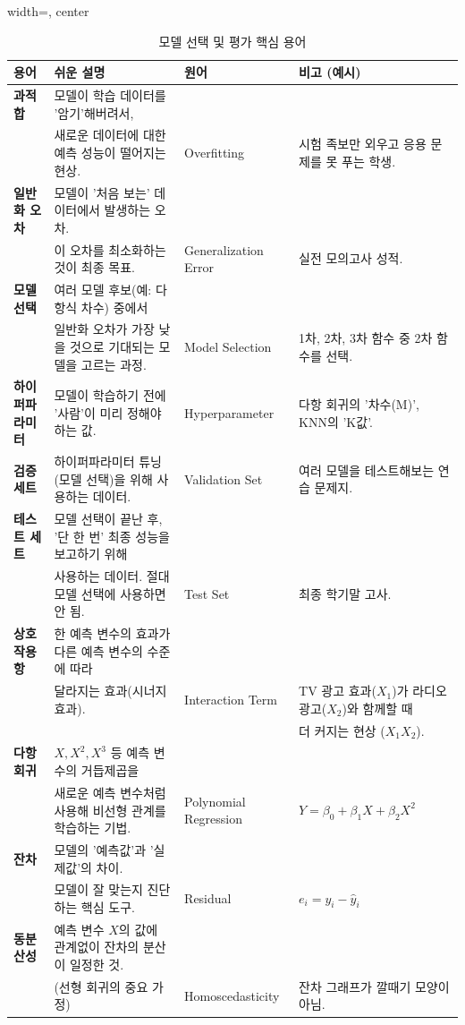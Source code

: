 \documentclass[11pt,a4paper]{book}
\theoremstyle{definition}
\begin{document}
\begin{table}[h!]
\caption{모델 선택 및 평가 핵심 용어}
\label{tab:terms}
\begin{adjustbox}{width=\textwidth, center}
\begin{tabular}{@{}llll@{}}
\toprule
용어 & 쉬운 설명 & 원어 & 비고 (예시) \\
\midrule
\textbf{과적합} & 모델이 학습 데이터를 '암기'해버려서, \\ & 새로운 데이터에 대한 예측 성능이 떨어지는 현상. & Overfitting & 시험 족보만 외우고 응용 문제를 못 푸는 학생. \\
\textbf{일반화 오차} & 모델이 '처음 보는' 데이터에서 발생하는 오차. \\ & 이 오차를 최소화하는 것이 최종 목표. & Generalization Error & 실전 모의고사 성적. \\
\textbf{모델 선택} & 여러 모델 후보(예: 다항식 차수) 중에서 \\ & 일반화 오차가 가장 낮을 것으로 기대되는 모델을 고르는 과정. & Model Selection & 1차, 2차, 3차 함수 중 2차 함수를 선택. \\
\textbf{하이퍼파라미터} & 모델이 학습하기 전에 '사람'이 미리 정해야 하는 값. & Hyperparameter & 다항 회귀의 '차수(M)', KNN의 'K값'. \\
\textbf{검증 세트} & 하이퍼파라미터 튜닝(모델 선택)을 위해 사용하는 데이터. & Validation Set & 여러 모델을 테스트해보는 연습 문제지. \\
\textbf{테스트 세트} & 모델 선택이 끝난 후, '단 한 번' 최종 성능을 보고하기 위해 \\ & 사용하는 데이터. 절대 모델 선택에 사용하면 안 됨. & Test Set & 최종 학기말 고사. \\
\textbf{상호작용 항} & 한 예측 변수의 효과가 다른 예측 변수의 수준에 따라 \\ & 달라지는 효과(시너지 효과). & Interaction Term & TV 광고 효과($X_1$)가 라디오 광고($X_2$)와 함께할 때 \\ & & & 더 커지는 현상 ($X_1 X_2$). \\
\textbf{다항 회귀} & $X, X^2, X^3$ 등 예측 변수의 거듭제곱을 \\ & 새로운 예측 변수처럼 사용해 비선형 관계를 학습하는 기법. & Polynomial Regression & $Y = \beta_0 + \beta_1 X + \beta_2 X^2$ \\
\textbf{잔차} & 모델의 '예측값'과 '실제값'의 차이. \\ & 모델이 잘 맞는지 진단하는 핵심 도구. & Residual & $e_i = y_i - \hat{y}_i$ \\
\textbf{동분산성} & 예측 변수 $X$의 값에 관계없이 잔차의 분산이 일정한 것. \\ & (선형 회귀의 중요 가정) & Homoscedasticity & 잔차 그래프가 깔때기 모양이 아님. \\

\end{tabular}
\end{adjustbox}
\end{table}
\end{document}

